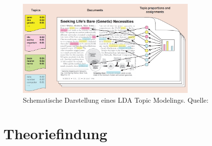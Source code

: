 \documentclass[12pt, twoside=false, bibliography=totoc, numbers=endperiod, headings=normal, toc=chapterentrydotfill]{scrbook}
\begin{document}
\begin{figure}
    \centering
    \includegraphics[width=0.8\textwidth]{document/images/lda_topic_model.png}
    \caption[Schematische Darstellung eines LDA Topic Modelings]{Schematische Darstellung eines LDA Topic Modelings. Quelle:  \parencite{blei_2012}}
    \label{fig:lda_example}
\end{figure}

{\let\clearpage\relax \chapter{Theoriefindung}}

\Blindtext

\setlength{\parskip}{8pt}
\printbibliography[title={Literaturverzeichnis}]
\end{document}
